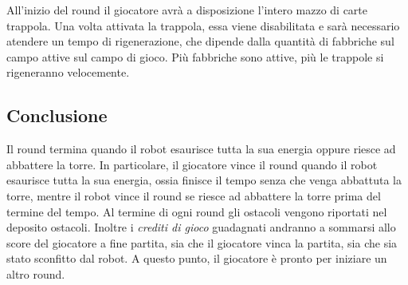 All'inizio del round il giocatore avrà a disposizione l'intero mazzo di carte trappola. Una volta attivata la trappola, essa viene disabilitata e sarà necessario atendere un tempo di rigenerazione, che dipende dalla quantità di fabbriche sul campo attive sul campo di gioco. Più fabbriche sono attive, più le trappole si rigeneranno velocemente.

	\subsection*{Conclusione} 
Il round termina quando il robot esaurisce tutta la sua energia oppure riesce ad abbattere la torre. In particolare, il giocatore vince il round quando il robot esaurisce tutta la sua energia, ossia finisce il tempo senza che venga abbattuta la torre, mentre il robot vince il round se riesce ad abbattere la torre prima del termine del tempo.
Al termine di ogni round gli ostacoli vengono riportati nel deposito ostacoli.
Inoltre i \emph{crediti di gioco} guadagnati andranno a sommarsi allo score del giocatore a fine partita, sia che il giocatore vinca la partita, sia che sia stato sconfitto dal robot.
A questo punto, il giocatore è pronto per iniziare un altro round.